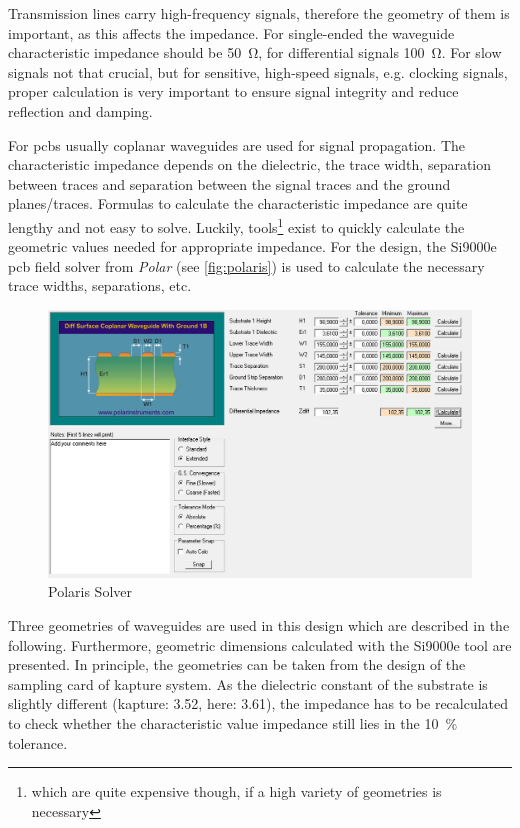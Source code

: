 Transmission lines carry high-frequency signals, therefore the geometry of them is important, as this affects the impedance.
For single-ended the waveguide characteristic impedance should be \SI{50}{\ohm}, for differential signals \SI{100}{\ohm}.
For slow signals not that crucial, but for sensitive, high-speed signals, e.g. clocking signals, proper calculation is very important to ensure signal integrity and reduce reflection and damping. 

For \glspl{pcb} usually coplanar waveguides are used for signal propagation.
The characteristic impedance depends on the dielectric, the trace width, separation between traces and separation between the signal traces and the ground planes/traces.
Formulas to calculate the characteristic impedance are quite lengthy and not easy to solve.
Luckily, tools\footnote{which are quite expensive though, if a high variety of geometries is necessary} exist to quickly calculate the geometric values needed for appropriate impedance. %
For the design, the Si9000e \gls{pcb} field solver from \textit{Polar} (see \autoref{fig:polaris}) is used to calculate the necessary trace widths, separations, etc.

\begin{figure}[tbh]
	\centering
	\includegraphics[width = \textwidth]{chap/04-work/img/polaris}
	\caption{Polaris Solver} %
	\label{fig:polaris}
\end{figure}

Three geometries of waveguides are used in this design which are described in the following.
Furthermore, geometric dimensions calculated with the Si9000e tool are presented.
In principle, the geometries can be taken from the design of the sampling card of \gls{kapture} system.
As the dielectric constant of the substrate is slightly different (\gls{kapture}: 3.52, here: 3.61), the impedance has to be recalculated to check whether the characteristic value impedance still lies in the \SI{10}{\percent} tolerance.

